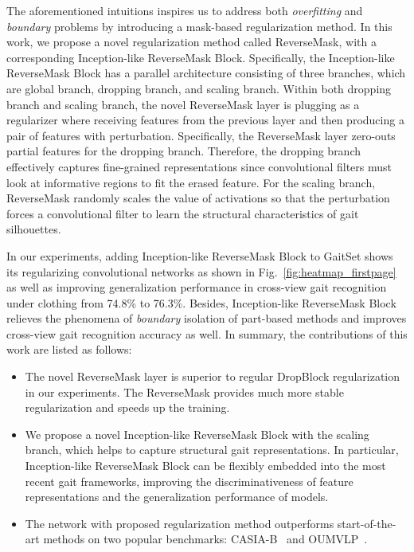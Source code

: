\documentclass[runningheads]{llncs}
\begin{document}
    The aforementioned intuitions inspires us to address both \textit{overfitting} and \textit{boundary} problems by introducing a mask-based regularization method. In this work, we propose a novel regularization method called ReverseMask, with a corresponding Inception-like ReverseMask Block. Specifically, the Inception-like ReverseMask Block has a parallel architecture consisting of three branches, which are global branch, dropping branch, and scaling branch. Within both dropping branch and scaling branch, the novel ReverseMask layer is plugging as a regularizer where receiving features from the previous layer and then producing a pair of features with perturbation. Specifically, the ReverseMask layer zero-outs partial features for the dropping branch. Therefore, the dropping branch effectively captures fine-grained representations since convolutional filters must look at informative regions to fit the erased feature. For the scaling branch, ReverseMask randomly scales the value of activations so that the perturbation forces a convolutional filter to learn the structural characteristics of gait silhouettes.
    
    In our experiments, adding Inception-like ReverseMask Block to GaitSet shows its regularizing convolutional networks as shown in Fig.~\ref{fig:heatmap_firstpage} as well as improving generalization performance in cross-view gait recognition under clothing from 74.8\% to 76.3\%. Besides, Inception-like ReverseMask Block relieves the phenomena of \textit{boundary} isolation of part-based methods and improves cross-view gait recognition accuracy as well.
    In summary, the contributions of this work are listed as follows:
    \begin{itemize}
        
        \item The novel ReverseMask layer is superior to regular DropBlock regularization in our experiments. The ReverseMask provides much more stable regularization and speeds up the training.
    
        \item We propose a novel Inception-like ReverseMask Block with the scaling branch, which helps to capture structural gait representations. In particular, Inception-like ReverseMask Block can be flexibly embedded into the most recent gait frameworks, improving the discriminativeness of feature representations and the generalization performance of models.
        
        \item The network with proposed regularization method outperforms start-of-the-art methods on two popular benchmarks: CASIA-B~\cite{casiab} and OUMVLP~\cite{oumvlp}.
    \end{itemize}
    
\end{document}
